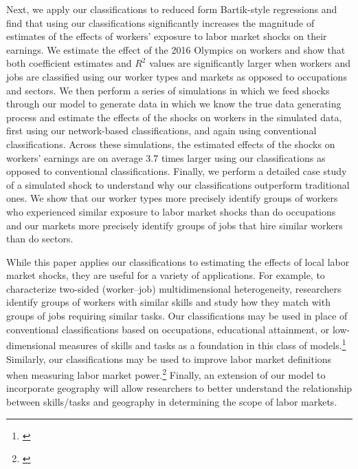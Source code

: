 \documentclass[12pt]{article}
\theoremstyle{definition}
\theoremstyle{plain}
\begin{document}
Next, we apply our classifications to reduced form Bartik-style regressions and find that using our classifications significantly increases the magnitude of estimates of the effects of workers' exposure to labor market shocks on their earnings. We estimate the effect of the 2016 Olympics on workers and show that both coefficient estimates and $R^2$ values are significantly larger when workers and jobs are classified using our worker types and markets as opposed to occupations and sectors. We then perform a series of simulations in which we feed shocks through our model to generate data in which we know the true data generating process and estimate the effects of the shocks on workers in the simulated data, first using our network-based classifications, and again using conventional classifications. Across these simulations, the estimated effects of the shocks on workers' earnings are on average 3.7 times larger using our classifications as opposed to conventional classifications. Finally, we perform a detailed case study of a simulated shock to understand why our classifications outperform traditional ones. We show that our worker types more precisely identify groups of workers who experienced similar exposure to labor market shocks than do occupations and our markets more precisely identify groups of jobs that hire similar workers than do sectors. 

While this paper applies our classifications to estimating the effects of local labor market shocks, they are useful for a variety of applications. For example, to characterize two-sided (worker--job) multidimensional heterogeneity, researchers identify groups of workers with similar skills and study how they match with groups of jobs requiring similar tasks. Our classifications may be used in place of conventional classifications based on occupations, educational attainment, or low-dimensional measures of skills and tasks as a foundation in this class of models.\footnote{\citet{AutorLevyMurnane2003,AcemogluAutor2011,Autor2013,Tan2018,Lindenlaub2017,Kantenga2018}} Similarly, our classifications may be used to improve labor market definitions when measuring labor market power.\footnote{\citet{BergerHerkenhoffMongey2022,Felix2021,AzarMarinescuSteinbaumTaska2018,BenmelechBergmanKim2018,Rinz2018,AzarMarinescuSteinbaum2019,SchubertStansburyTaska2020,Arnold2020,Lipsius2018,JaroschNimczikSorkin2019}} Finally, an extension of our model to incorporate geography will allow researchers to better understand the relationship between skills/tasks and geography in determining the scope of labor markets.  
\end{document}
